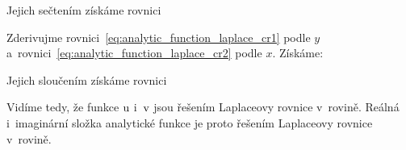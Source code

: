 
Jejich sečtením získáme rovnici


Zderivujme rovnici~\eqref{eq:analytic_function_laplace_cr1} podle \(y\) a~rovnici~\eqref{eq:analytic_function_laplace_cr2} podle \(x\). Získáme:


Jejich sloučením získáme rovnici


Vidíme tedy, že funkce \(\mathrm{u}\) i~\(\mathrm{v}\) jsou řešením Laplaceovy rovnice v~rovině. Reálná i~imaginární složka analytické funkce je proto řešením Laplaceovy rovnice v~rovině.
